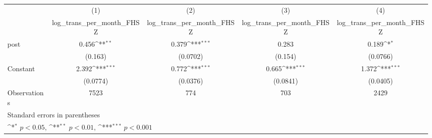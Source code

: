 {
\def\sym#1{\ifmmode^{#1}\else\(^{#1}\)\fi}
\begin{tabular}{l*{4}{c}}
\hline\hline
                    &\multicolumn{1}{c}{(1)}&\multicolumn{1}{c}{(2)}&\multicolumn{1}{c}{(3)}&\multicolumn{1}{c}{(4)}\\
                    &\multicolumn{1}{c}{log\_trans\_per\_month\_FHSZ}&\multicolumn{1}{c}{log\_trans\_per\_month\_FHSZ}&\multicolumn{1}{c}{log\_trans\_per\_month\_FHSZ}&\multicolumn{1}{c}{log\_trans\_per\_month\_FHSZ}\\
\hline
post                &       0.456\sym{**} &       0.379\sym{***}&       0.283         &       0.189\sym{*}  \\
                    &     (0.163)         &    (0.0702)         &     (0.154)         &    (0.0766)         \\
[1em]
Constant            &       2.392\sym{***}&       0.772\sym{***}&       0.665\sym{***}&       1.372\sym{***}\\
                    &    (0.0774)         &    (0.0376)         &    (0.0841)         &    (0.0405)         \\
\hline
Observations        &        7523         &         774         &         703         &        2429         \\
\hline\hline
\multicolumn{5}{l}{\footnotesize Standard errors in parentheses}\\
\multicolumn{5}{l}{\footnotesize \sym{*} \(p<0.05\), \sym{**} \(p<0.01\), \sym{***} \(p<0.001\)}\\
\end{tabular}
}
